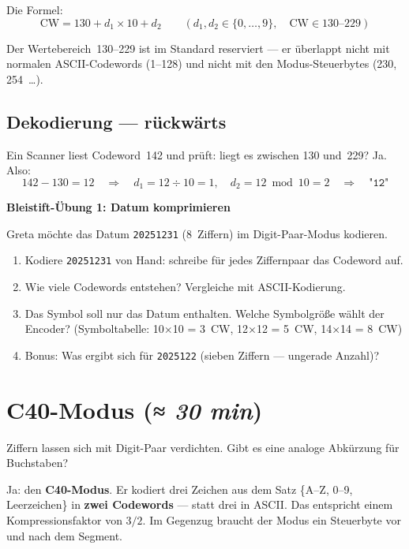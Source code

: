 Die Formel:
\[
  \text{CW} = 130 + d_1 \times 10 + d_2
  \qquad
  (d_1, d_2 \in \{0, \dots, 9\},\quad \text{CW} \in 130 \text{–} 229)
\]

Der Wertebereich~130–229 ist im Standard reserviert — er überlappt
nicht mit normalen ASCII-Codewords (1–128) und nicht mit den
Modus-Steuerbytes (230, 254~\dots).

\subsection*{Dekodierung — rückwärts}

Ein Scanner liest Codeword~142 und prüft: liegt es zwischen 130 und~229?
Ja. Also:
\[
  142 - 130 = 12 \quad\Rightarrow\quad d_1 = 12 \div 10 = 1,\quad
  d_2 = 12 \bmod 10 = 2 \quad\Rightarrow\quad \texttt{"12"}
\]

\begin{bleistiftuebung}
\textbf{Bleistift-Übung 1: Datum komprimieren}

Greta möchte das Datum \texttt{20251231} (8~Ziffern) im Digit-Paar-Modus kodieren.

\begin{enumerate}[label=\alph*)]
\item Kodiere \texttt{20251231} von Hand: schreibe für jedes Ziffernpaar
  das Codeword auf.
\item Wie viele Codewords entstehen? Vergleiche mit ASCII-Kodierung.
\item Das Symbol soll nur das Datum enthalten. Welche Symbolgröße
  wählt der Encoder? (Symboltabelle: 10×10 = 3~CW, 12×12 = 5~CW,
  14×14 = 8~CW)
\item Bonus: Was ergibt sich für \texttt{2025122} (sieben Ziffern —
  ungerade Anzahl)?
\end{enumerate}
\end{bleistiftuebung}

\section{C40-Modus \normalfont(\textit{≈ 30 min})}

Ziffern lassen sich mit Digit-Paar verdichten. Gibt es eine analoge
Abkürzung für Buchstaben?

Ja: den \textbf{C40-Modus}. Er kodiert drei Zeichen aus dem Satz
\{A–Z, 0–9, Leerzeichen\} in \textbf{zwei Codewords} — statt drei in
ASCII. Das entspricht einem Kompressionsfaktor von $3/2$. Im Gegenzug
braucht der Modus ein Steuerbyte vor und nach dem Segment.


